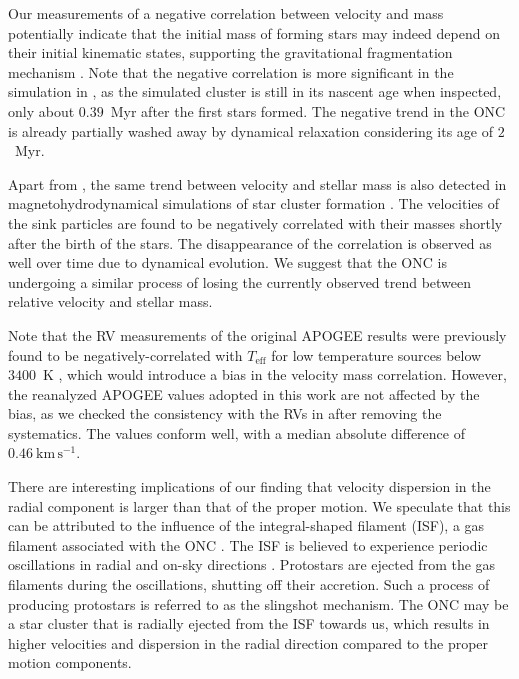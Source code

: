 \documentclass[12pt]{ucsddissertation}
\begin{document}
\begin{CJK*}{UTF8}{gbsn}
Our measurements of a negative correlation between velocity and mass potentially indicate that the initial mass of forming stars may indeed depend on their initial kinematic states, supporting the gravitational fragmentation mechanism \citep[][]{Bonnell-2008}. Note that the negative correlation is more significant in the simulation in \citet{Bonnell-2008}, as the simulated cluster is still in its nascent age when inspected, only about $0.39$~Myr after the first stars formed. The negative trend in the ONC is already partially washed away by dynamical relaxation considering its age of $2$~Myr. 

Apart from \citet{Bonnell-2008}, the same trend between velocity and stellar mass is also detected in magnetohydrodynamical simulations of star cluster formation \citep[][]{Mathew-2021}. The velocities of the sink particles are found to be negatively correlated with their masses shortly after the birth of the stars. The disappearance of the correlation is observed as well over time due to dynamical evolution. We suggest that the ONC is undergoing a similar process of losing the currently observed trend between relative velocity and stellar mass.

Note that the RV measurements of the original APOGEE results were previously found to be negatively-correlated with $T_\mathrm{eff}$ for low temperature sources below $3400$~K \citep[][]{Cottaar-2014, Kounkel-2019}, which would introduce a bias in the velocity mass correlation. However, the reanalyzed APOGEE values adopted in this work are not affected by the bias, as we checked the consistency with the RVs in \citet{Kounkel-2019} after removing the systematics. The values conform well, with a median absolute difference of $0.46~\mathrm{km}\,\mathrm{s}^{-1}$.

There are interesting implications of our finding that velocity dispersion in the radial component is larger than that of the proper motion. We speculate that this can be attributed to the influence of the integral-shaped filament (ISF), a gas filament associated with the ONC \citep{Bally-1987}. The ISF is believed to experience periodic oscillations in radial and on-sky directions \citep[e.g.,][]{Stutz-2016, Stutz-2018, Matus-2023}. Protostars are ejected from the gas filaments during the oscillations, shutting off their accretion. Such a process of producing protostars is referred to as the slingshot mechanism. The ONC may be a star cluster that is radially ejected from the ISF towards us, which results in higher velocities and dispersion in the radial direction compared to the proper motion components.


\end{CJK*}
\end{document}
